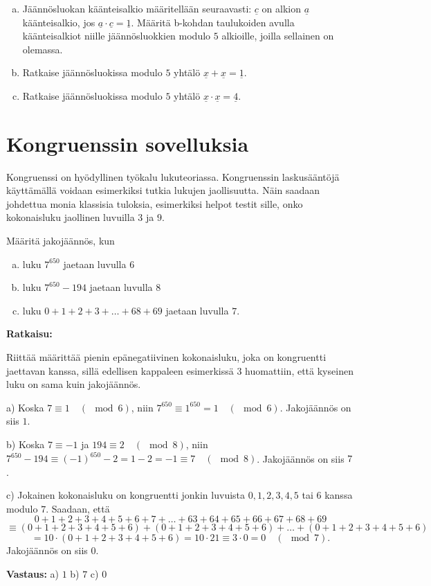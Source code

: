 \begin{enumerate}
\begin{enumerate}[a)]
\item Jäännösluokan käänteisalkio määritellään seuraavasti: $\underline{c}$ on alkion $\underline{a}$ käänteisalkio, jos $\underline{a} \cdot \underline{c} = \underline{1}$. Määritä b-kohdan taulukoiden avulla käänteisalkiot niille jäännösluokkien modulo $5$ alkioille, joilla sellainen on olemassa.
\item Ratkaise jäännösluokissa modulo $5$ yhtälö $\underline{x}+\underline{x}=\underline{1}$.
\item Ratkaise jäännösluokissa modulo $5$ yhtälö $\underline{x}\cdot \underline{x}=\underline{4}$.
\end{enumerate}

\end{enumerate}

\newpage

\section{Kongruenssin sovelluksia}
Kongruenssi on hyödyllinen työkalu lukuteoriassa. Kongruenssin laskusääntöjä käyttämällä voidaan esimerkiksi tutkia lukujen jaollisuutta. Näin saadaan johdettua monia klassisia tuloksia, esimerkiksi helpot testit sille, onko kokonaisluku jaollinen luvuilla $3$ ja $9$.

\begin{esimerkki}
Määritä jakojäännös, kun
\begin{enumerate}[a)]
\item luku $7^{650}$ jaetaan luvulla $6$
\item luku $7^{650} - 194$ jaetaan luvulla $8$
\item luku $0+1+2+3+ \ldots + 68 + 69$ jaetaan luvulla $7$.
\end{enumerate}

{\bf Ratkaisu:}

Riittää määrittää pienin epänegatiivinen kokonaisluku, joka on kongruentti jaettavan kanssa, sillä edellisen kappaleen esimerkissä 3 huomattiin, että kyseinen luku on sama kuin jakojäännös.

a) Koska $7 \equiv 1 \quad(\mod 6)$, niin $7^{650} \equiv 1^{650} = 1 \quad (\mod 6)$. Jakojäännös on siis $1$.

b) Koska $7 \equiv -1$ ja $194 \equiv 2 \quad(\mod 8)$, niin $7^{650} - 194 \equiv (-1)^{650} - 2 = 1 - 2 = -1 \equiv 7 \quad(\mod 8)$. Jakojäännös on siis $7$.

c) Jokainen kokonaisluku on kongruentti jonkin luvuista $0, 1, 2, 3, 4, 5$ tai $6$ kanssa modulo $7$. Saadaan, että
\[
0+1+2+3+4+5+6+7+ \ldots +63+64+65+66+67+68+69
\]
\[
 \equiv (0+1+2+3+4+5+6)+(0+1+2+3+4+5+6)+ \ldots +(0+1+2+3+4+5+6)
\]
\[
=10 \cdot (0+1+2+3+4+5+6) = 10\cdot 21 \equiv 3\cdot 0 = 0 \quad(\mod 7).
\]
Jakojäännös on siis $0$.

{\bf Vastaus:} a) $1$ b) $7$ c) $0$
\end{esimerkki}

